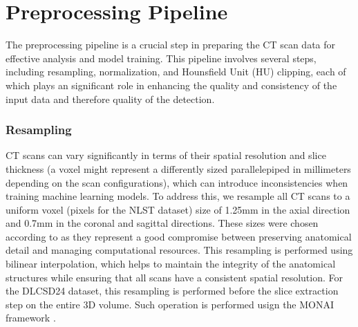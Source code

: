 




\section{Preprocessing Pipeline}
\label{sec:preprocessing}

The preprocessing pipeline is a crucial step in preparing the CT scan data for effective analysis and model training. This pipeline involves several steps, including resampling, normalization, and Hounsfield Unit (HU) clipping, each of which plays an significant role in enhancing the quality and consistency of the input data and therefore quality of the detection.

\subsubsection{Resampling}
\label{sec:resampling}
CT scans can vary significantly in terms of their spatial resolution and slice thickness (a voxel might represent a differently sized parallelepiped in millimeters depending on the scan configurations), which can introduce inconsistencies when training machine learning models. To address this, we resample all CT scans to a uniform voxel (pixels for the NLST dataset) size of 1.25mm in the axial direction and 0.7mm in the coronal and sagittal directions.
These sizes were chosen according to \cite{tushar2025ailunghealthbenchmarking} as they represent a good compromise between preserving anatomical detail and managing computational resources.
This resampling is performed using bilinear interpolation, which helps to maintain the integrity of the anatomical structures while ensuring that all scans have a consistent spatial resolution.
For the DLCSD24 dataset, this resampling is performed before the slice extraction step on the entire 3D volume. Such operation is performed usign the MONAI framework \cite{monai}.

